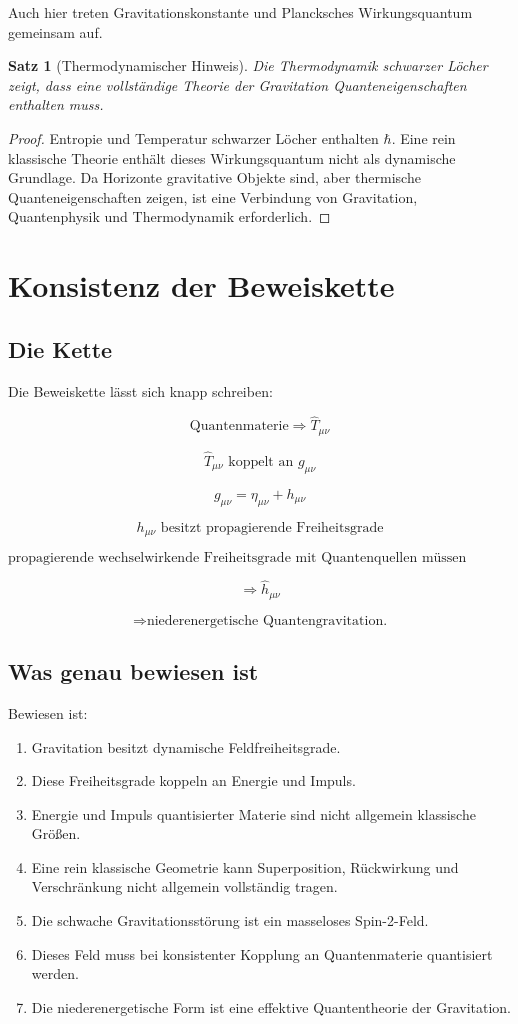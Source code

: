 \documentclass[11pt,a4paper,oneside]{book}
\theoremstyle{definition}
\theoremstyle{plain}
\newtheorem{satz}[definition]{Satz}
\theoremstyle{remark}
\begin{document}
Auch hier treten Gravitationskonstante und Plancksches Wirkungsquantum gemeinsam auf.

\begin{satz}[Thermodynamischer Hinweis]
Die Thermodynamik schwarzer Löcher zeigt, dass eine vollständige Theorie der Gravitation Quanteneigenschaften enthalten muss.
\end{satz}

\begin{proof}
Entropie und Temperatur schwarzer Löcher enthalten $\hbar$. Eine rein klassische Theorie enthält dieses Wirkungsquantum nicht als dynamische Grundlage. Da Horizonte gravitative Objekte sind, aber thermische Quanteneigenschaften zeigen, ist eine Verbindung von Gravitation, Quantenphysik und Thermodynamik erforderlich.
\end{proof}

\chapter{Konsistenz der Beweiskette}
\section{Die Kette}
Die Beweiskette lässt sich knapp schreiben:

\[
\text{Quantenmaterie}\Rightarrow \hat T_{\mu\nu}
\]

\[
\hat T_{\mu\nu}\text{ koppelt an }g_{\mu\nu}
\]

\[
g_{\mu\nu}=\eta_{\mu\nu}+h_{\mu\nu}
\]

\[
h_{\mu\nu}\text{ besitzt propagierende Freiheitsgrade}
\]

\[
\text{propagierende wechselwirkende Freiheitsgrade mit Quantenquellen müssen quantisiert werden}
\]

\[
\Rightarrow \hat h_{\mu\nu}
\]

\[
\Rightarrow \text{niederenergetische Quantengravitation.}
\]

\section{Was genau bewiesen ist}
Bewiesen ist:

\begin{enumerate}[label=\arabic*.]
\item Gravitation besitzt dynamische Feldfreiheitsgrade.
\item Diese Freiheitsgrade koppeln an Energie und Impuls.
\item Energie und Impuls quantisierter Materie sind nicht allgemein klassische Größen.
\item Eine rein klassische Geometrie kann Superposition, Rückwirkung und Verschränkung nicht allgemein vollständig tragen.
\item Die schwache Gravitationsstörung ist ein masseloses Spin-2-Feld.
\item Dieses Feld muss bei konsistenter Kopplung an Quantenmaterie quantisiert werden.
\item Die niederenergetische Form ist eine effektive Quantentheorie der Gravitation.
\end{enumerate}
\end{document}
